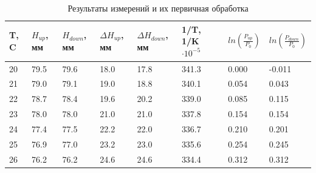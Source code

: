 \begin{table}[h!]
\caption{Результаты измерений и их первичная обработка}
\begin{tabular}{|l|l|l|l|l|l|ll}
\hline
T, C                       & $H_{up}$, мм           & $H_{down}$, мм           & $\Delta H_{up}$, мм               & $\Delta H_{down}$, мм              & 1/T, 1/K $\cdot 10 ^ {-5}$ & \multicolumn{1}{l|}{$ln(\frac{P_{up}}{P_0})$} & \multicolumn{1}{l|}{$ln(\frac{P_{down}}{P_0})$} \\ \hline
20                         & 79.5                   & 79.6                     & 18.0                              & 17.8                               & 341.3                      & \multicolumn{1}{l|}{0.000}                    & \multicolumn{1}{l|}{-0.011}                     \\ \hline
21                         & 79.0                   & 79.1                     & 19.0                              & 18.8                               & 340.1                      & \multicolumn{1}{l|}{0.054}                    & \multicolumn{1}{l|}{0.043}                      \\ \hline
22                         & 78.7                   & 78.4                     & 19.6                              & 20.2                               & 339.0                      & \multicolumn{1}{l|}{0.085}                    & \multicolumn{1}{l|}{0.115}                      \\ \hline
23                         & 78.0                   & 78.0                     & 21.0                              & 21.0                               & 337.8                      & \multicolumn{1}{l|}{0.154}                    & \multicolumn{1}{l|}{0.154}                      \\ \hline
24                         & 77.4                   & 77.5                     & 22.2                              & 22.0                               & 336.7                      & \multicolumn{1}{l|}{0.210}                    & \multicolumn{1}{l|}{0.201}                      \\ \hline
25                         & 76.9                   & 77.0                     & 23.2                              & 23.0                               & 335.6                      & \multicolumn{1}{l|}{0.254}                    & \multicolumn{1}{l|}{0.245}                      \\ \hline
26                         & 76.2                   & 76.2                     & 24.6                              & 24.6                               & 334.4                      & \multicolumn{1}{l|}{0.312}                    & \multicolumn{1}{l|}{0.312}                      \\ \hline

\end{tabular}
\end{table}
